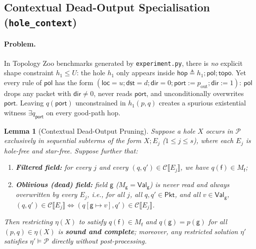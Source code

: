 \documentclass[11pt,a4paper]{article}
\newtheorem{lemma}[theorem]{Lemma}
\theoremstyle{definition}
\theoremstyle{remark}
\newcommand{\Pkt}{\mathsf{Pkt}}
\newcommand{\Val}{\mathsf{Val}}
\newcommand{\Csem}[1]{\mathcal{C}\llbracket #1 \rrbracket}
\begin{document}
\subsection{Contextual Dead-Output Specialisation (\texttt{hole\_context})}

\paragraph{Problem.}
In Topology Zoo benchmarks generated by \texttt{experiment.py}, there is \emph{no} explicit shape
constraint $h_1 \le U$: the hole $h_1$ only appears inside $\mathsf{hop} \triangleq h_1 ; \mathsf{pol} ; \mathsf{topo}$.
Yet every rule of $\mathsf{pol}$ has the form
$(\mathsf{loc} = u ; \mathsf{dst} = d ; \mathsf{dir} = 0 ; \mathsf{port} := p_{\mathrm{out}} ; \mathsf{dir} := 1)$:
$\mathsf{pol}$ drops any packet with $\mathsf{dir} \neq 0$, never reads $\mathsf{port}$, and
unconditionally overwrites $\mathsf{port}$. Leaving $q(\mathsf{port})$ unconstrained in
$h_1(p, q)$ creates a spurious existential witness $\exists q_{\mathsf{port}}$ on every good-path hop.

\begin{lemma}[Contextual Dead-Output Pruning]
\label{lem:dead-output}
Suppose a hole $X$ occurs in $\mathcal{P}$ exclusively in sequential subterms of the form $X ; E_j$
($1 \le j \le s$), where each $E_j$ is hole-free and star-free. Suppose further that:
\begin{enumerate}[label=(\arabic*)]
  \item \textbf{Filtered field:} for every $j$ and every $(q, q') \in \Csem{E_j}$, we have
        $q(\mathsf{f}) \in M_{\mathsf{f}}$;
  \item \textbf{Oblivious (dead) field:} field $\mathsf{g}$ ($M_{\mathsf{g}} = \Val_{\mathsf{g}}$)
        is never read and always overwritten by every $E_j$, i.e., for all $j$, all $q, q' \in \Pkt$,
        and all $v \in \Val_{\mathsf{g}}$,
        $(q, q') \in \Csem{E_j} \iff (q[\mathsf{g} \mapsto v], q') \in \Csem{E_j}$.
\end{enumerate}
Then restricting $\eta(X)$ to satisfy $q(\mathsf{f}) \in M_{\mathsf{f}}$ and
$q(\mathsf{g}) = p(\mathsf{g})$ for all $(p, q) \in \eta(X)$ is \textbf{sound and complete};
moreover, any restricted solution $\eta'$ satisfies $\eta' \models \mathcal{P}$ directly without
post-processing.
\end{lemma}
\end{document}
